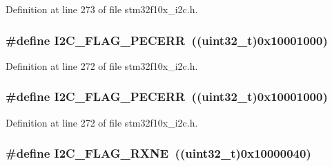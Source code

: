 Definition at line 273 of file stm32f10x\+\_\+i2c.\+h.

\subsubsection[{\texorpdfstring{I2\+C\+\_\+\+F\+L\+A\+G\+\_\+\+P\+E\+C\+E\+RR}{I2C_FLAG_PECERR}}]{\setlength{\rightskip}{0pt plus 5cm}\#define I2\+C\+\_\+\+F\+L\+A\+G\+\_\+\+P\+E\+C\+E\+RR~(({\bf uint32\+\_\+t})0x10001000)}\hypertarget{group___i2_c__flags__definition_ga6c7addb6413f165f42bcc87506ea8467}{}\label{group___i2_c__flags__definition_ga6c7addb6413f165f42bcc87506ea8467}


Definition at line 272 of file stm32f10x\+\_\+i2c.\+h.

\subsubsection[{\texorpdfstring{I2\+C\+\_\+\+F\+L\+A\+G\+\_\+\+P\+E\+C\+E\+RR}{I2C_FLAG_PECERR}}]{\setlength{\rightskip}{0pt plus 5cm}\#define I2\+C\+\_\+\+F\+L\+A\+G\+\_\+\+P\+E\+C\+E\+RR~(({\bf uint32\+\_\+t})0x10001000)}\hypertarget{group___i2_c__flags__definition_ga6c7addb6413f165f42bcc87506ea8467}{}\label{group___i2_c__flags__definition_ga6c7addb6413f165f42bcc87506ea8467}


Definition at line 272 of file stm32f10x\+\_\+i2c.\+h.

\subsubsection[{\texorpdfstring{I2\+C\+\_\+\+F\+L\+A\+G\+\_\+\+R\+X\+NE}{I2C_FLAG_RXNE}}]{\setlength{\rightskip}{0pt plus 5cm}\#define I2\+C\+\_\+\+F\+L\+A\+G\+\_\+\+R\+X\+NE~(({\bf uint32\+\_\+t})0x10000040)}\hypertarget{group___i2_c__flags__definition_gad53c5b70a186f699f187c7a641ab0dac}{}\label{group___i2_c__flags__definition_gad53c5b70a186f699f187c7a641ab0dac}


